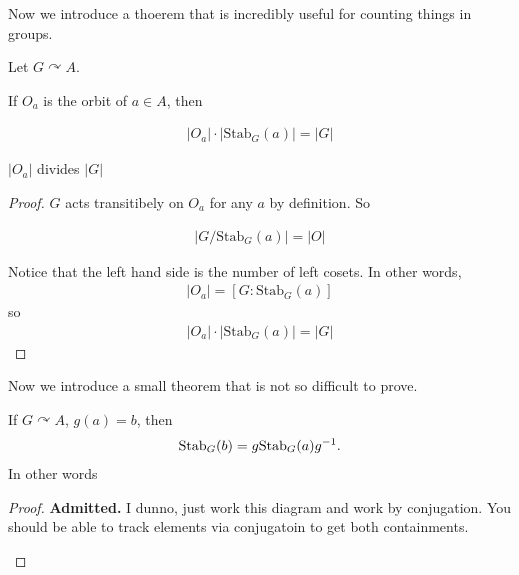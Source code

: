 \documentclass[12pt, twosided]{article}
\begin{document}
Now we introduce a thoerem that is incredibly useful for counting things in groups.
\begin{cor}
  Let \(G \curvearrowright A\).

  If \(O_a\) is the orbit of \(a \in A\), then

  \begin{align*}
    |O_a|\cdot |\mathrm{Stab}_G(a)| = |G|
  \end{align*}
\end{cor}

\begin{cor}
  \(|O_a|\) divides \(|G|\)
\end{cor}

\begin{proof}
  \(G\) acts transitibely on \(O_a\) for any \(a\) by definition. So

  \begin{align*}
    \left\vert G/\mathrm{Stab}_G(a)\right\vert = |O|
  \end{align*}

  Notice that the left hand side is the number of left cosets. In other words,
  \begin{align*}
    |O_a| = [G:\mathrm{Stab}_G(a)]
  \end{align*}
  so
  \begin{align*}
    |O_a| \cdot |\mathrm{Stab}_G(a)| = |G|
  \end{align*}
\end{proof}

Now we introduce a small theorem that is not so difficult to prove.

\begin{thm}
  If \(G \curvearrowright A\), \(g(a) = b\), then
  \begin{align*}
    \mathrm{Stab}_G(b) = g\mathrm{Stab}_G(a)g^{-1}.
  \end{align*}
  In other words 
\end{thm}

\begin{proof} \textbf{Admitted.} I dunno, just work this diagram and work by conjugation. You should be able to track elements via conjugatoin to get both containments.
  \begin{center}
  \end{center}
\end{proof}
\end{document}
